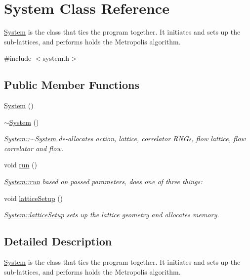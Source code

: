\hypertarget{class_system}{}\section{System Class Reference}
\label{class_system}


\mbox{\hyperlink{class_system}{System}} is the class that ties the program together. It initiates and sets up the sub-\/lattices, and performs holds the Metropolis algorithm.  




{\ttfamily \#include $<$system.\+h$>$}

\subsection*{Public Member Functions}
\begin{DoxyCompactItemize}
\item 
\mbox{\hyperlink{class_system_ae317936c9bcf1374d61745572e0f2f8a}{System}} ()
\item 
\mbox{\hyperlink{class_system_a3be70bb338e3f062f821173fd15680d0}{$\sim$\+System}} ()
\begin{DoxyCompactList}\small\item\em \mbox{\hyperlink{class_system_a3be70bb338e3f062f821173fd15680d0}{System\+::$\sim$\+System}} de-\/allocates action, lattice, correlator R\+N\+Gs, flow lattice, flow correlator and flow. \end{DoxyCompactList}\item 
void \mbox{\hyperlink{class_system_afa39feb75f96798930f4bfb48205f40b}{run}} ()
\begin{DoxyCompactList}\small\item\em \mbox{\hyperlink{class_system_afa39feb75f96798930f4bfb48205f40b}{System\+::run}} based on passed parameters, does one of three things\+: \end{DoxyCompactList}\item 
void \mbox{\hyperlink{class_system_a93c8a8258ac8f6382ec393bca1271011}{lattice\+Setup}} ()
\begin{DoxyCompactList}\small\item\em \mbox{\hyperlink{class_system_a93c8a8258ac8f6382ec393bca1271011}{System\+::lattice\+Setup}} sets up the lattice geometry and allocates memory. \end{DoxyCompactList}\end{DoxyCompactItemize}


\subsection{Detailed Description}
\mbox{\hyperlink{class_system}{System}} is the class that ties the program together. It initiates and sets up the sub-\/lattices, and performs holds the Metropolis algorithm. 


